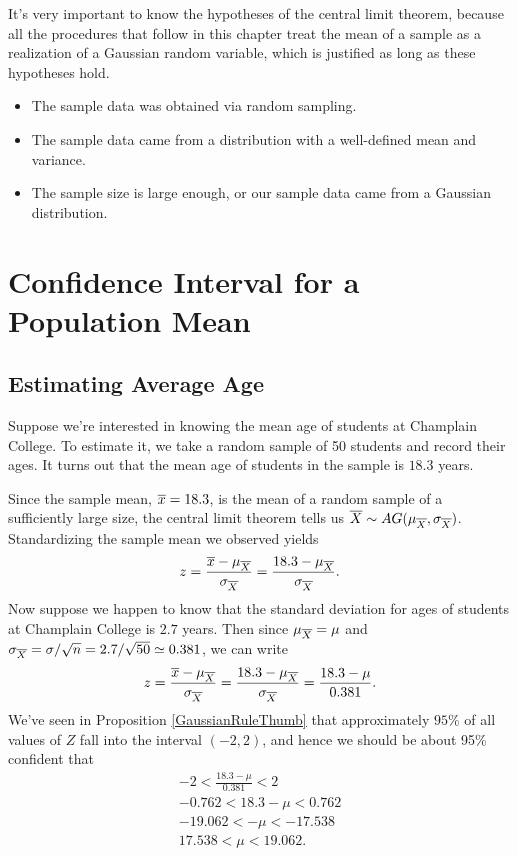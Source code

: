 \begin{keypoint}
It's very important to know the hypotheses of the central limit theorem, because all the procedures that follow in this chapter treat the mean of a sample as a realization of a Gaussian random variable, which is justified as long as these hypotheses hold.
\begin{itemize}
\item The sample data was obtained via random sampling.
\item The sample data came from a distribution with a well-defined mean and variance.
\item The sample size is large enough, or our sample data came from a Gaussian distribution.
\end{itemize}
\end{keypoint}



\section{Confidence Interval for a Population Mean}\label{ConfIntervalIntro}

\subsection*{Estimating Average Age}

Suppose we're interested in knowing the mean age of students at Champlain College. To estimate it, we take a random sample of 50 students and record their ages. It turns out that the mean age of students in the sample is $18.3$ years.

Since the sample mean, ${\overline{x}} = 18.3$, is the mean of a random sample of a sufficiently large size, the central limit theorem tells us ${\overline{X}} \sim AG(\mu_{\overline{X}}, \sigma_{\overline{X}})$. Standardizing the sample mean we observed yields
$$z = \frac{\overline{x} - \mu_{\overline{X}}}{\sigma_{\overline{X}}} = \frac{18.3 - \mu_{\overline{X}}}{\sigma_{\overline{X}}}.$$
Now suppose we happen to know that the standard deviation for ages of students at Champlain College is $2.7$ years. Then since $\mu_{\overline{X}} = \mu$ and $\sigma_{\overline{X}} = \sigma / \sqrt{n} = 2.7 / \sqrt{50} \simeq 0.381$, we can write
$$z = \frac{\overline{x}  - \mu_{\overline{X}}}{\sigma_{\overline{X}}} = \frac{18.3 - \mu_{\overline{X}}}{\sigma_{\overline{X}}} = \frac{18.3 - \mu}{0.381}.$$
We've seen in Proposition \ref{GaussianRuleThumb} that approximately $95\%$ of all values of $Z$ fall into the interval $(-2, 2)$, and hence we should be about 95\% confident that
\begin{gather*}
-2 < \textstyle\frac{18.3 - \mu}{0.381} < 2 \\
-0.762 < 18.3 - \mu < 0.762 \\
-19.062 < - \mu < -17.538 \\
17.538 < \mu < 19.062.
\end{gather*}

